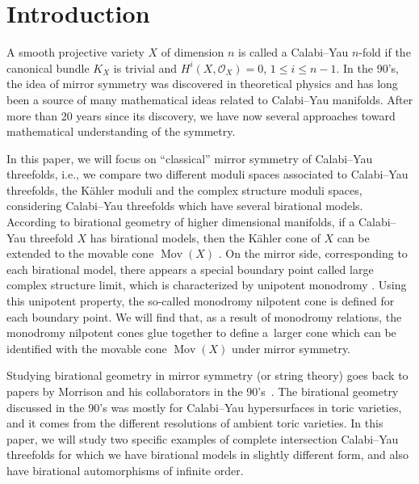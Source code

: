 \documentclass[pdftex]{sigma}
\numberwithin{equation}{section}
\begin{document}
\section{Introduction}

A smooth projective variety $X$ of dimension $n$ is called a Calabi--Yau $n$-fold if the canonical bundle $K_{X}$ is trivial and $H^{i}(X,\mathcal{O}_{X})=0$, $1\leq i\leq n-1$. In the 90's, the idea of mirror symmetry was discovered in theoretical physics and has long been a source of many mathematical ideas related to Calabi--Yau manifolds. After more than 20 years since its discovery, we have now several approaches \cite{GS1,GS2, Ko,SYZ} toward mathematical understanding of the symmetry.

In this paper, we will focus on ``classical'' mirror symmetry of Calabi--Yau threefolds, i.e., we compare two different moduli spaces associated to Calabi--Yau threefolds, the K\"ahler moduli and the complex structure moduli spaces, considering Calabi--Yau threefolds which have several birational models. According to birational geometry of higher dimensional manifolds, if a Calabi--Yau threefold $X$ has birational models, then the K\"ahler cone of $X$ can be extended to the movable cone $\operatorname{Mov}(X)$ \cite{KawCone, MoKahler}. On the mirror side, corresponding to each birational model, there appears a special boundary point called large complex structure limit, which is characterized by unipotent monodromy \cite{MoLCSL}. Using this unipotent property, the so-called monodromy nilpotent cone is defined for each boundary point. We will find that, as a result of monodromy relations, the monodromy nilpotent cones glue together to define a~larger cone which can be identified with the movable cone $\operatorname{Mov}(X)$ under mirror symmetry.

Studying birational geometry in mirror symmetry (or string theory) goes back to papers by Morrison and his collaborators in the 90's~\cite{AGM}. The birational geometry discussed in the 90's was mostly for Calabi--Yau hypersurfaces in toric varieties, and it comes from the different resolutions of ambient toric varieties. In this paper, we will study two specific examples of complete intersection Calabi--Yau threefolds for which we have birational models in slightly different form, and also have birational automorphisms of infinite order.
\end{document}
